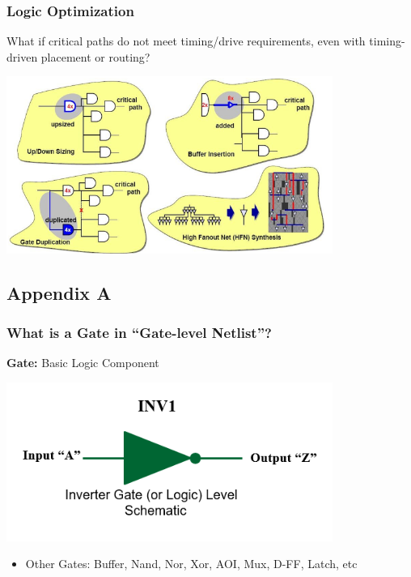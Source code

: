 \documentclass[compress]{beamer}
\begin{document}
	\begin{frame}
		\frametitle{Logic Optimization}
		What if critical paths do not meet timing/drive requirements,
		even with timing-driven placement or routing?
		\begin{center}
			\includegraphics[width=0.8\textwidth]{Logic}
		\end{center}
	\end{frame}
\subsection[Appendix A]{Appendix A}
\begin{frame}
	\frametitle{What is a Gate in “Gate-level Netlist”?}
	\textbf{Gate:} Basic Logic Component
	\begin{center}
		\includegraphics[width=0.8\textwidth]{INV}
	\end{center}
	\begin{itemize}
		\item Other Gates:
				\newline
					Buffer, Nand, Nor, Xor, AOI, Mux, D-FF, Latch, etc
	\end{itemize}
\end{frame}
\end{document}
